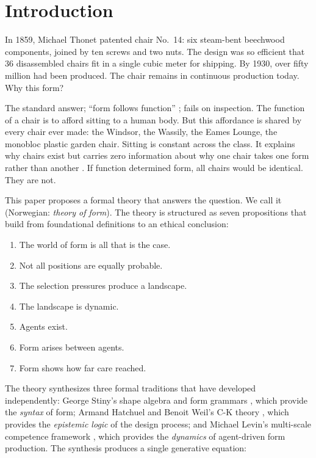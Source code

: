 \section{Introduction}
\label{sec:introduction}

In 1859, Michael Thonet patented chair No.\ 14: six steam-bent beechwood components, joined by ten screws and two nuts. The design was so efficient that 36 disassembled chairs fit in a single cubic meter for shipping. By 1930, over fifty million had been produced. The chair remains in continuous production today. Why this form?

The standard answer; ``form follows function'' \parencite{Sullivan1896}; fails on inspection. The function of a chair is to afford sitting to a human body. But this affordance is shared by every chair ever made: the Windsor, the Wassily, the Eames Lounge, the monobloc plastic garden chair. Sitting is constant across the class. It explains why chairs exist but carries zero information about why one chair takes one form rather than another \parencite{Michl1995}. If function determined form, all chairs would be identical. They are not.

This paper proposes a formal theory that answers the question. We call it \formlaere{} (Norwegian: \textit{theory of form}). The theory is structured as seven propositions that build from foundational definitions to an ethical conclusion:

\begin{enumerate}
\item The world of form is all that is the case.
\item Not all positions are equally probable.
\item The selection pressures produce a landscape.
\item The landscape is dynamic.
\item Agents exist.
\item Form arises between agents.
\item Form shows how far care reached.
\end{enumerate}

The theory synthesizes three formal traditions that have developed independently: George Stiny's shape algebra and form grammars \parencite{Stiny1972, Stiny2006}, which provide the \textit{syntax} of form; Armand Hatchuel and Benoit Weil's C-K theory \parencite{Hatchuel2003, Hatchuel2009}, which provides the \textit{epistemic logic} of the design process; and Michael Levin's multi-scale competence framework \parencite{Levin2022, Fields2022, Doctor2024}, which provides the \textit{dynamics} of agent-driven form production. The synthesis produces a single generative equation:

